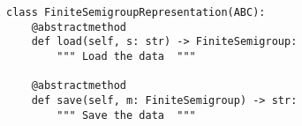 \par\begin{minipage}{60ex}
\begin{verbatim}
class FiniteSemigroupRepresentation(ABC):
    @abstractmethod
    def load(self, s: str) -> FiniteSemigroup:
        """ Load the data  """

    @abstractmethod
    def save(self, m: FiniteSemigroup) -> str:
        """ Save the data  """
\end{verbatim}
\end{minipage}\par